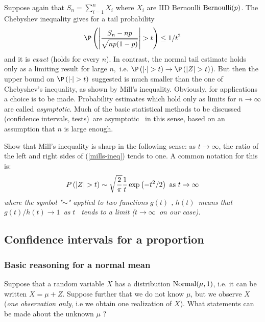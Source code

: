 Suppose again that $S_{n}=\sum_{i=1}^{n}X_{i}$ where $X_{i}$ are IID
Bernoulli $\mbox{{\rm Bernoulli}}(p)$. The Chebyshev inequality gives for a tail
probability 
\begin{equation*}
\P \left( \left\vert \frac{S_{n}-np}{\sqrt{np(1-p)}}\right\vert >t\right)
\leq 1/t^{2}
\end{equation*}%
and it is \textit{exact} (holds for every $n$). In contrast, the normal tail
estimate holds only as a limiting result for large $n,$ i.e. $\P \left(
\left\vert \cdot \right\vert >t\right) \rightarrow \P \left( \left\vert
Z\right\vert >t\right) $). But then the upper bound on $\P \left(
\left\vert \cdot \right\vert >t\right) $ suggested is much smaller than the
one of Chebyshev's inequality, as shown by Mill's inequality. Obviously, for
applications a choice is to be made. Probability estimates which hold only
as limits for $n\rightarrow \infty $ are called \textit{asymptotic}. Much of
the basic statistical methods to be discussed (confidence intervals, tests)\
are asymptotic \ in this sense, based on an assumption that $n$ is large
enough. \bigskip

\begin{Exercise}
Show that Mill's inequality is sharp in the
following sense: as $t\rightarrow \infty$, the ratio of the left and
right sides of (\ref{mills-ineq}) tends to one. A common notation for this
is: 
\begin{equation*}
P\left( \left\vert Z\right\vert >t\right) \sim \sqrt{\frac{2}{\pi }}\frac{1}{%
t}\exp \left( -t^{2}/2\right) \text{ as }t\rightarrow \infty
\end{equation*}%
\emph{where the symbol "}$\sim $\emph{" applied to two functions }$g(t)$%
\emph{, }$h(t)$\emph{\ means that }$g(t)/h(t)\rightarrow 1$\emph{\ as }$t$%
\emph{\ tends to a limit (}$t\rightarrow \infty $\emph{\ on our case). }
\end{Exercise}

\subsection{Confidence intervals for a proportion}\label{S:ConfIntForProps}

\subsubsection{Basic reasoning for a normal mean}

Suppose that a random variable $X$ has a distribution $\mbox{{\rm Normal}}(\mu ,1)$, i.e. it
can be written $X=\mu +Z$. Suppose further that we do not know $\mu $, but
we observe $X$ (\textit{one observation only}, i.e we obtain one realization
of $X$). What statements can be made about the unknown $\mu $ ?

